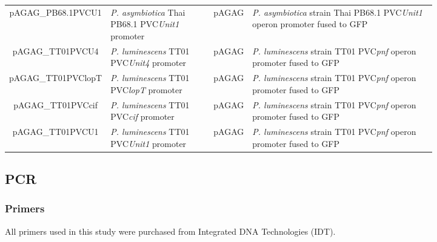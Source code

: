 \begin{landscape}
\begin{tabularx}{\linewidth}{ c >{\centering\arraybackslash} m{0.26\linewidth} >{\centering} m{0.08\linewidth} m{0.48\linewidth} }
pAGAG\_PB68.1PVCU1 & \emph{P. asymbiotica} Thai PB68.1 PVC\emph{Unit1} promoter & pAGAG & \emph{P. asymbiotica} strain Thai PB68.1 PVC\emph{Unit1} operon promoter fused to GFP\\

pAGAG\_TT01PVCU4 & \emph{P. luminescens} TT01 PVC\emph{Unit4} promoter & pAGAG & \emph{P. luminescens} strain TT01 PVC\emph{pnf} operon promoter fused to GFP\\

pAGAG\_TT01PVClopT & \emph{P. luminescens} TT01 PVC\emph{lopT} promoter & pAGAG & \emph{P. luminescens} strain TT01 PVC\emph{pnf} operon promoter fused to GFP\\

pAGAG\_TT01PVCcif & \emph{P. luminescens} TT01 PVC\emph{cif} promoter & pAGAG & \emph{P. luminescens} strain TT01 PVC\emph{pnf} operon promoter fused to GFP\\

pAGAG\_TT01PVCU1 & \emph{P. luminescens} TT01 PVC\emph{Unit1} promoter & pAGAG & \emph{P. luminescens} strain TT01 PVC\emph{pnf} operon promoter fused to GFP\\

\end{tabularx}

\end{landscape}

\subsection{PCR}
	\subsubsection{Primers}\label{primers}
	All primers used in this study were purchased from Integrated DNA Technologies (IDT).

